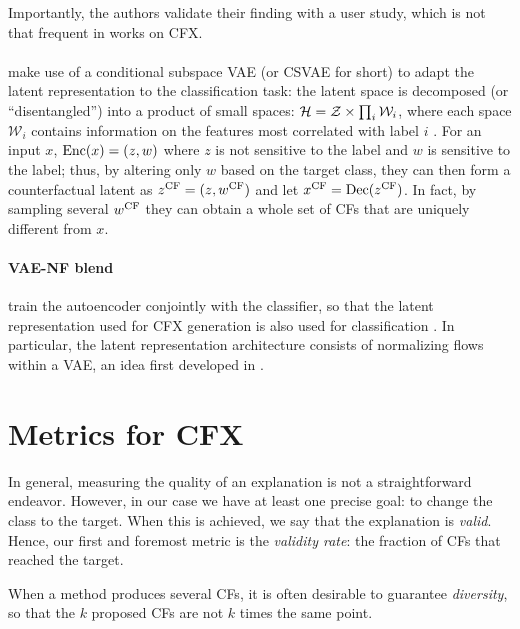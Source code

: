 \documentclass[../main.tex]{subfiles}
\begin{document}
Importantly, the authors validate their finding with a user study, which is not that frequent in works on CFX.

\paragraph{}

\citeauthor{downsCRUDS2020} make use of a conditional subspace VAE (or CSVAE for short) to adapt the latent representation to the classification task:
the latent space is decomposed (or ``disentangled'') into a product of small spaces: $\mathcal{H} = \mathcal{Z} \times \prod_{i} \mathcal{W}_i$, where each space $\mathcal{W}_i$ contains information on the features most correlated with label $i$ \cite{klysLearning2018}.
For an input $x$, $\operatorname{Enc}(x) = (z, w)$ where $z$ is not sensitive to the label and $w$ is sensitive to the label; thus, by altering only $w$ based on the target class, they can then form a counterfactual latent as $z^\mathrm{CF} = (z, w^\mathrm{CF})$ and let $x^\mathrm{CF} = \operatorname{Dec}(z^\mathrm{CF})$.
In fact, by sampling several $w^\mathrm{CF}$ they can obtain a whole set of CFs that are uniquely different from $x$.

\paragraph{VAE-NF blend}

\citeauthor{zhangInterpretable2022} train the autoencoder conjointly with the classifier, so that the latent representation used for CFX generation is also used for classification \cite{zhangInterpretable2022}.
In particular, the latent representation architecture consists of normalizing flows within a VAE, an idea first developed in \cite{rezendeVariational2015}.

\section{Metrics for CFX}

In general, measuring the quality of an explanation is not a straightforward endeavor.
However, in our case we have at least one precise goal: to change the class to the target.
When this is achieved, we say that the explanation is \emph{valid}.
Hence, our first and foremost metric is the \emph{validity rate}: the fraction of CFs that reached the target.

When a method produces several CFs, it is often desirable to guarantee \emph{diversity}, so that the $k$ proposed CFs are not $k$ times the same point.
\end{document}
